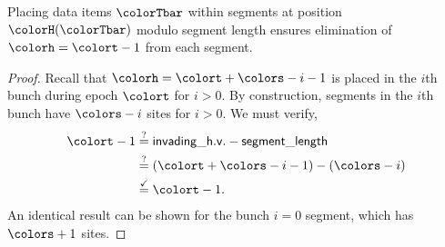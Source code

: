 \begin{lemma}[Placements overwrite \hv{} $\colorh = \colort - 1$]
Placing data items $\colorTbar$ within segments at position $\colorH(\colorTbar)$ modulo segment length ensures elimination of \hv{} $\colorh = \colort - 1$ from each segment.
\end{lemma} \label{thm:steady-hv-elimination}
\begin{proof}
Recall that \hv{} $\colorh = \colort + \colors - i - 1$ is placed in the $i$th bunch during epoch $\colort$ for $i>0$.
By construction, segments in the $i$th bunch have $\colors - i$ sites for $i>0$.
We must verify,
\begin{align*}
\colort - 1
&\stackrel{?}{=}
\mathsf{invading\_h.v.} - \mathsf{segment\_length}\\
&\stackrel{?}{=}
(\colort + \colors - i - 1) - (\colors - i)
 \\
&\stackrel{\checkmark}{=} \colort - 1.
\end{align*}
An identical result can be shown for the bunch $i=0$ segment, which has $\colors+1$ sites.
\end{proof}

